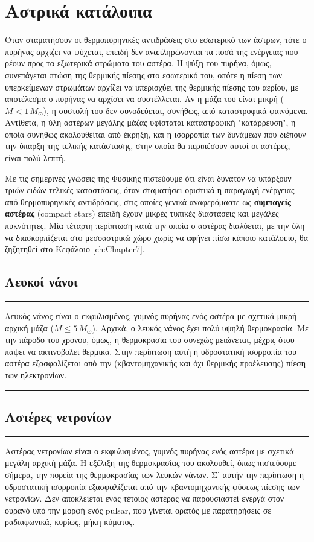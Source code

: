\chapter{Αστρικά κατάλοιπα}
\label{ch:Chapter6}

Όταν σταματήσουν οι θερμοπυρηνικές αντιδράσεις στο εσωτερικό των άστρων, τότε ο πυρήνας αρχίζει να ψύχεται, επειδή δεν αναπληρώνονται τα ποσά της ενέργειας που ρέουν προς τα εξωτερικά στρώματα του αστέρα. Η ψύξη του πυρήνα, όμως, συνεπάγεται πτώση της θερμικής πίεσης στο εσωτερικό του, οπότε η πίεση των υπερκείμενων στρωμάτων αρχίζει να υπερισχύει της θερμικής πίεσης του αερίου, με αποτέλεσμα ο πυρήνας να αρχίσει να συστέλλεται. Αν η μάζα του είναι μικρή ($M < 1\,M_\odot$), η συστολή του δεν συνοδεύεται, συνήθως, από καταστροφικά φαινόμενα. Αντίθετα, η ύλη αστέρων μεγάλης μάζας υφίσταται καταστροφική "κατάρρευση", η οποία συνήθως ακολουθείται από έκρηξη, και η ισορροπία των δυνάμεων που διέπουν την ύπαρξη της τελικής κατάστασης, στην οποία θα περιπέσουν αυτοί οι αστέρες, είναι πολύ λεπτή.

Με τις σημερινές γνώσεις της Φυσικής πιστεύουμε ότι είναι δυνατόν να υπάρξουν τριών ειδών τελικές καταστάσεις, όταν σταματήσει οριστικά η παραγωγή ενέργειας από θερμοπυρηνικές αντιδράσεις, στις οποίες γενικά αναφερόμαστε ως \textbf{συμπαγείς αστέρας} (compact stars) επειδή έχουν μικρές τυπικές διαστάσεις και μεγάλες πυκνότητες. Μία τέταρτη περίπτωση κατά την οποία ο αστέρας διαλύεται, με την ύλη να διασκορπίζεται στο μεσοαστρικώ χώρο χωρίς να αφήνει πίσω κάποιο κατάλοιπο, θα ζηζητηθεί στο Κεφάλαιο \ref{ch:Chapter7}.


\section{Λευκοί νάνοι}
{\color{red} \hrule}
Λευκός νάνος είναι ο εκφυλισμένος, γυμνός πυρήνας ενός αστέρα με σχετικά μικρή αρχική μάζα ($M \leq 5\,M_\odot$). Αρχικά, ο λευκός νάνος έχει πολύ υψηλή θερμοκρασία. Με την πάροδο του χρόνου, όμως, η θερμοκρασία του συνεχώς μειώνεται, μέχρις ότου πάψει να ακτινοβολεί θερμικά. Στην περίπτωση αυτή η υδροστατική ισορροπία του αστέρα εξασφαλίζεται από την (κβαντομηχανικής και όχι θερμικής προέλευσης) πίεση των ηλεκτρονίων. \\
{\color{red} \hrule}




\section{Αστέρες νετρονίων}
{\color{red} \hrule}
Αστέρας νετρονίων είναι ο εκφυλισμένος, γυμνός πυρήνας ενός αστέρα με σχετικά μεγάλη αρχική μάζα. Η εξέλιξη της θερμοκρασίας του ακολουθεί, όπως πιστεύουμε σήμερα, την πορεία της θερμοκρασίας των λευκών νάνων. Σ' αυτήν την περίπτωση η υδροστατική ισορροπία εξασφαλίζεται από την κβαντομηχανικής φύσεως πίεσης των νετρονίων. Δεν αποκλείεται ενάς τέτοιος αστέρας να παρουσιαστεί ενεργά στον ουρανό υπό την μορφή ενός pulsar, που γίνεται ορατός με παρατηρήσεις σε ραδιαφωνικά, κυρίως, μήκη κύματος.\\
{\color{red} \hrule}





